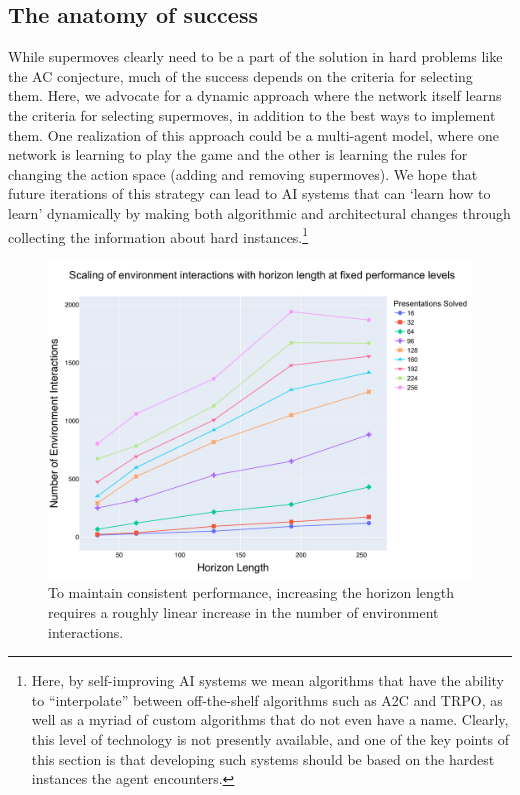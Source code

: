 \subsection{The anatomy of success}

While supermoves clearly need to be a part of the solution in hard problems like the AC conjecture, much of the success depends on the criteria for selecting them. Here, we advocate for a dynamic approach where the network itself learns the criteria for selecting supermoves, in addition to the best ways to implement them. One realization of this approach could be a multi-agent model, where one network is learning to play the game and the other is learning the rules for changing the action space (adding and removing supermoves). We hope that future iterations of this strategy can lead to AI systems that can `learn how to learn' dynamically by making both algorithmic and architectural changes through collecting the information about hard instances.\footnote{Here, by self-improving AI systems we mean algorithms that have the ability to ``interpolate'' between off-the-shelf algorithms such as A2C and TRPO, as well as a myriad of custom algorithms that do not even have a name. Clearly, this level of technology is not presently available, and one of the key points of this section is that developing such systems should be based on the hardest instances the agent encounters.}

\begin{figure}
	\centering
	\includegraphics[scale=0.35]{fig/env_vs_horizon.pdf}
	\caption{To maintain consistent performance, increasing the horizon length requires a roughly linear increase in the number of environment interactions.}
	\label{fig:env_vs_horizon}
\end{figure}

